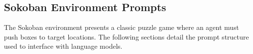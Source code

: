 



\subsection{Sokoban Environment Prompts}

The Sokoban environment presents a classic puzzle game where an agent must push boxes to target locations. The following sections detail the prompt structure used to interface with language models.

